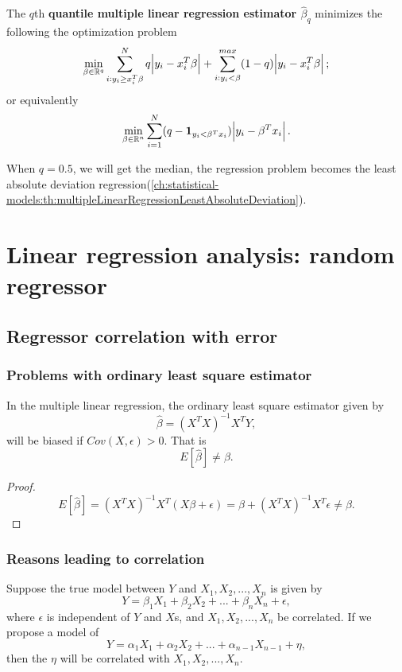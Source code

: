 \begin{refsection}
\begin{definition}
The $q$th \textbf{quantile multiple linear regression estimator $\hat{\beta}_q$} minimizes the following the optimization problem
$$\min_{\beta \in \mathbb{R}^q} \sum_{i:y_i\geq x_i^T\beta}^{N} q\abs{y_i-x_i^T\beta} + \sum_{i:y_i < \beta}^{max}(1-q)\abs{y_i-x_i^T\beta};$$
or equivalently
$$\min_{\beta \in \mathbb{R}^n} \sum_{i=1}^{N} (q-\bm{1}_{y_i<\beta^Tx_i})\abs{y_i-\beta^Tx_i}.$$

\end{definition}

\begin{remark}
When $q = 0.5$, we will get the median, the regression problem becomes the least absolute deviation regression(\autoref{ch:statistical-models:th:multipleLinearRegressionLeastAbsoluteDeviation}). 
\end{remark}


\section{Linear regression analysis: random regressor}


\subsection{Regressor correlation with error}

\subsubsection{Problems with ordinary least square estimator}

\begin{lemma}
In the multiple linear regression, the ordinary least square estimator given by
$$\hat{\beta} = (X^TX)^{-1}X^TY,$$
will be biased if $Cov(X,\epsilon) > 0.$
That is
$$E[\hat{\beta}] \neq \beta.$$	
\end{lemma}
\begin{proof}
$$E[\hat{\beta}] = (X^TX)^{-1}X^T(X\beta+\epsilon) = \beta + (X^TX)^{-1}X^T\epsilon\neq \beta.$$	
\end{proof}

\subsubsection{Reasons leading to correlation}

\begin{remark}
\cite[407]{hill2008principles}
Suppose the true model between $Y$ and $X_1,X_2,...,X_n$ is given by
$$Y = \beta_1X_1+\beta_2X_2+...+\beta_nX_n + \epsilon,$$
where $\epsilon$ is independent of $Y$ and $X$s, and $X_1,X_2,...,X_n$ be correlated. If we propose a model of 
$$Y = \alpha_1X_1+\alpha_2X_2+...+\alpha_{n-1}X_{n-1} + \eta,$$
then the $\eta$ will be correlated with $X_1,X_2,...,X_n$.	
\end{remark}



\end{refsection}
